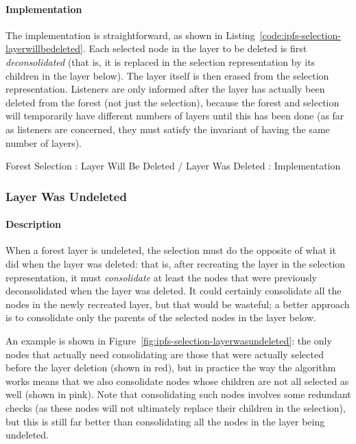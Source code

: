 \paragraph{Implementation}

The implementation is straightforward, as shown in Listing~\ref{code:ipfs-selection-layerwillbedeleted}. Each selected node in the layer to be deleted is first \emph{deconsolidated} (that is, it is replaced in the selection representation by its children in the layer below). The layer itself is then erased from the selection representation. Listeners are only informed after the layer has actually been deleted from the forest (not just the selection), because the forest and selection will temporarily have different numbers of layers until this has been done (as far as listeners are concerned, they must satisfy the invariant of having the same number of layers).

\begin{stulisting}[p]
\caption{Forest Selection : Layer Will Be Deleted / Layer Was Deleted : Implementation}
\label{code:ipfs-selection-layerwillbedeleted}

\end{stulisting}

\afterpage{\clearpage}
\newpage

\subsubsection{Layer Was Undeleted}

\paragraph{Description}

When a forest layer is undeleted, the selection must do the opposite of what it did when the layer was deleted: that is, after recreating the layer in the selection representation, it must \emph{consolidate} at least the nodes that were previously deconsolidated when the layer was deleted. It could certainly consolidate all the nodes in the newly recreated layer, but that would be wasteful; a better approach is to consolidate only the parents of the selected nodes in the layer below.

An example is shown in Figure~\ref{fig:ipfs-selection-layerwasundeleted}: the only nodes that actually need consolidating are those that were actually selected before the layer deletion (shown in red), but in practice the way the algorithm works means that we also consolidate nodes whose children are not all selected as well (shown in pink). Note that consolidating such nodes involves some redundant checks (as these nodes will not ultimately replace their children in the selection), but this is still far better than consolidating all the nodes in the layer being undeleted.

